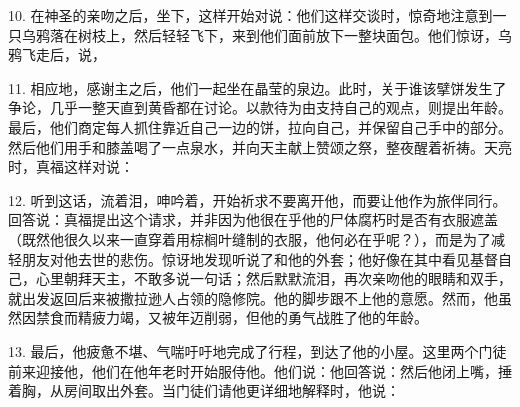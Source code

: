 10. 在神圣的亲吻之后，坐下，这样开始对说：他们这样交谈时，惊奇地注意到一只乌鸦落在树枝上，然后轻轻飞下，来到他们面前放下一整块面包。他们惊讶，乌鸦飞走后，说，\par

11. 相应地，感谢主之后，他们一起坐在晶莹的泉边。此时，关于谁该擘饼发生了争论，几乎一整天直到黄昏都在讨论。以款待为由支持自己的观点，则提出年龄。最后，他们商定每人抓住靠近自己一边的饼，拉向自己，并保留自己手中的部分。然后他们用手和膝盖喝了一点泉水，并向天主献上赞颂之祭，整夜醒着祈祷。天亮时，真福这样对说：\par

12. 听到这话，流着泪，呻吟着，开始祈求不要离开他，而要让他作为旅伴同行。回答说：真福提出这个请求，并非因为他很在乎他的尸体腐朽时是否有衣服遮盖（既然他很久以来一直穿着用棕榈叶缝制的衣服，他何必在乎呢？），而是为了减轻朋友对他去世的悲伤。惊讶地发现听说了和他的外套；他好像在其中看见基督自己，心里朝拜天主，不敢多说一句话；然后默默流泪，再次亲吻他的眼睛和双手，就出发返回后来被撒拉逊人占领的隐修院。他的脚步跟不上他的意愿。然而，他虽然因禁食而精疲力竭，又被年迈削弱，但他的勇气战胜了他的年龄。\par

13. 最后，他疲惫不堪、气喘吁吁地完成了行程，到达了他的小屋。这里两个门徒前来迎接他，他们在他年老时开始服侍他。他们说：他回答说：然后他闭上嘴，捶着胸，从房间取出外套。当门徒们请他更详细地解释时，他说：\par

